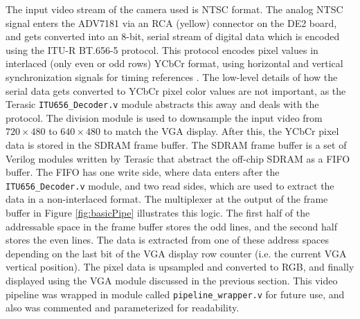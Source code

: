 \documentclass[11pt]{article} %
\begin{document}
The input video stream of the camera used is NTSC format. The analog NTSC signal enters the ADV7181 via an RCA (yellow) connector on the DE2 board, and gets converted into an 8-bit, serial stream of digital data which is encoded using the ITU-R BT.656-5 protocol. This protocol encodes pixel values in interlaced (only even or odd rows) YCbCr format, using horizontal and vertical synchronization signals for timing references \cite{itu}. The low-level details of how the serial data gets converted to YCbCr pixel color values are not important, as the Terasic \texttt{ITU656\_Decoder.v} module abstracts this away and deals with the protocol. The division module is used to downsample the input video from $720 \times 480$ to $640 \times 480$ to match the VGA display. After this, the YCbCr pixel data is stored in the SDRAM frame buffer. The SDRAM frame buffer is a set of Verilog modules written by Terasic that abstract the off-chip SDRAM as a FIFO buffer. The FIFO has one write side, where data enters after the \texttt{ITU656\_Decoder.v} module, and two read sides, which are used to extract the data in a non-interlaced format. The multiplexer at the output of the frame buffer in Figure \ref{fig:basicPipe} illustrates this logic. The first half of the addressable space in the frame buffer stores the odd lines, and the second half stores the even lines. The data is extracted from one of these address spaces depending on the last bit of the VGA display row counter (i.e. the current VGA vertical position). The pixel data is upsampled and converted to RGB, and finally displayed using the VGA module discussed in the previous section. This video pipeline was wrapped in module called \texttt{pipeline\_wrapper.v} for future use, and also was commented and parameterized for readability.
\end{document}
